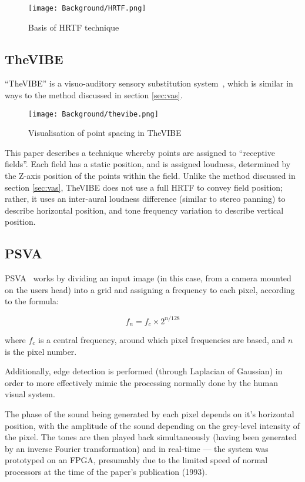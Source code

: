 \begin{figure}[H]
    \centering
    \texttt{[image: Background/HRTF.png]}
    \caption{Basis of HRTF technique~\cite{hrtf-diagram}}
\end{figure}

\subsection{TheVIBE}
``TheVIBE'' is a visuo-auditory sensory substitution system~\cite{thevibe}, which is similar in ways to the method discussed in section \ref{sec:vas}.

\begin{figure}[H]
    \centering
    \texttt{[image: Background/thevibe.png]}
    \caption{Visualisation of point spacing in TheVIBE}
\end{figure}

This paper describes a technique whereby points are assigned to ``receptive fields''. Each field has a static position, and is assigned loudness, determined by the Z-axis position of the points within the field. Unlike the method discussed in section \ref{sec:vas}, TheVIBE does not use a full \ac{HRTF} to convey field position; rather, it uses an inter-aural loudness difference (similar to stereo panning) to describe horizontal position, and tone frequency variation to describe vertical position.

\subsection{PSVA}
\ac{PSVA}~\cite{412057} works by dividing an input image (in this case, from a camera mounted on the users head) into a grid and assigning a frequency to each pixel, according to the formula:

\begin{equation}
    f_{n} = f_{c} \times 2^{n/128}
\end{equation}

where $f_{c}$ is a central frequency, around which pixel frequencies are based, and $n$ is the pixel number. 

Additionally, edge detection is performed (through Laplacian of Gaussian) in order to more effectively mimic the processing normally done by the human visual system.

The phase of the sound being generated by each pixel depends on it's horizontal position, with the amplitude of the sound depending on the grey-level intensity of the pixel. The tones are then played back simultaneously (having been generated by an inverse Fourier transformation) and in real-time --- the system was prototyped on an \ac{FPGA}, presumably due to the limited speed of normal processors at the time of the paper's publication (1993). 

